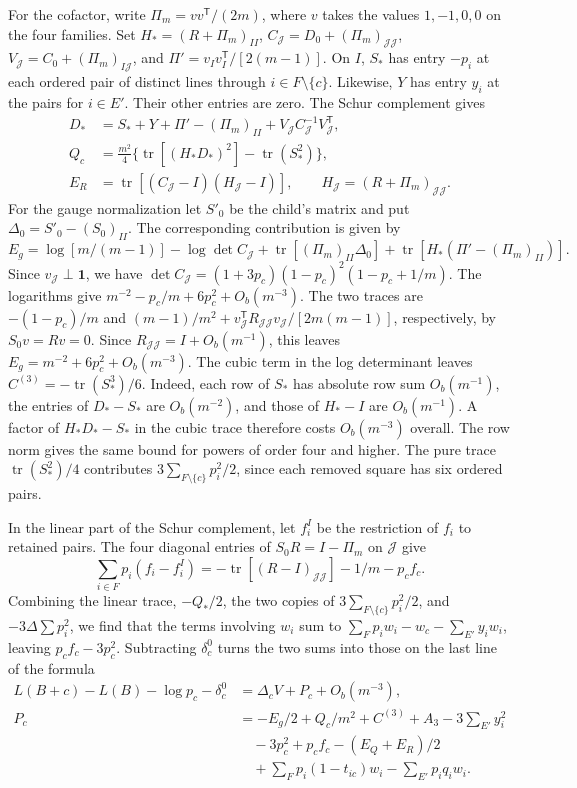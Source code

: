 For the cofactor, write \(\Pi_m=vv^{\mathsf T}/(2m)\), where \(v\) takes the values \(1,-1,0,0\) on the
four families. Set \(H_*=(R+\Pi_m)_{II}\), \(C_{\mathcal J}=D_0+(\Pi_m)_{\mathcal J\mathcal J}\),
\(V_{\mathcal J}=C_0+(\Pi_m)_{I\mathcal J}\), and \(\Pi'=v_Iv_I^{\mathsf T}/[2(m-1)]\). On \(I\), \(S_*\)
has entry \(-p_i\) at each ordered pair of distinct lines through \(i\in F\setminus\{c\}\). Likewise,
\(Y\) has entry \(y_i\) at the pairs for \(i\in E'\). Their other entries are zero. The Schur complement
gives \begin{align*}
 D_*&=S_*+Y+\Pi'-(\Pi_m)_{II}+V_{\mathcal J} C_{\mathcal J}^{-1}V_{\mathcal J}^{\mathsf T},\\
 Q_c&=\tfrac{m^2}4\{\operatorname{tr}[(H_*D_*)^2]-\operatorname{tr}(S_*^2)\},\\
 E_R&=\operatorname{tr}[(C_{\mathcal J}-I)(H_{\mathcal J}-I)],\qquad H_{\mathcal J}=(R+\Pi_m)_{\mathcal
 J\mathcal J}.
\end{align*} For the gauge normalization let \(S'_0\) be the child's matrix and put
\(\Delta_0=S'_0-(S_0)_{II}\). The corresponding contribution is given by \[
 E_g=\log[m/(m-1)]-\log\det C_{\mathcal J}
   +\operatorname{tr}[(\Pi_m)_{II}\Delta_0]
   +\operatorname{tr}[H_*(\Pi'-(\Pi_m)_{II})].
\] Since \(v_{\mathcal J}\perp\mathbf1\), we have \(\det C_{\mathcal J}=(1+3p_c)(1-p_c)^2(1-p_c+1/m)\).
The logarithms give \(m^{-2}-p_c/m+6p_c^2+O_b(m^{-3})\). The two traces are \(-(1-p_c)/m\) and
\((m-1)/m^2+v_{\mathcal J}^{\mathsf T}R_{\mathcal J\mathcal J}v_{\mathcal J}/[2m(m-1)]\), respectively,
by \(S_0v=Rv=0\). Since \(R_{\mathcal J\mathcal J}=I+O_b(m^{-1})\), this leaves
\(E_g=m^{-2}+6p_c^2+O_b(m^{-3})\). The cubic term in the log determinant leaves
\(C^{(3)}=-\operatorname{tr}(S_*^3)/6\). Indeed, each row of \(S_*\) has absolute row sum
\(O_b(m^{-1})\), the entries of \(D_*-S_*\) are \(O_b(m^{-2})\), and those of \(H_*-I\) are
\(O_b(m^{-1})\). A factor of \(H_*D_*-S_*\) in the cubic trace therefore costs \(O_b(m^{-3})\) overall.
The row norm gives the same bound for powers of order four and higher. The pure trace
\(\operatorname{tr}(S_*^2)/4\) contributes \(3\sum_{F\setminus\{c\}}p_i^2/2\), since each removed square
has six ordered pairs.

In the linear part of the Schur complement, let \(f_i^I\) be the restriction of \(f_i\) to retained
pairs. The four diagonal entries of \(S_0R=I-\Pi_m\) on \(\mathcal J\) give \[
 \sum_{i\in F}p_i(f_i-f_i^I)
 =-\operatorname{tr}[(R-I)_{\mathcal J\mathcal J}]-1/m-p_cf_c .
\] Combining the linear trace, \(-Q_*/2\), the two copies of \(3\sum_{F\setminus\{c\}}p_i^2/2\), and
\(-3\Delta\sum p_i^2\), we find that the terms involving \(w_i\) sum to
\(\sum_F p_iw_i-w_c-\sum_{E'}y_iw_i\), leaving \(p_cf_c-3p_c^2\). Subtracting \(\delta_c^0\)
turns the two sums into those on the last line of
the formula \begin{align*}
 L(B+c)-L(B)-\log p_c-\delta_c^0
   &=\Delta_c V+P_c+O_b(m^{-3}),\\
 P_c&=-E_g/2+Q_c/m^2+C^{(3)}+A_3-3\sum_{E'}y_i^2\\
 &\quad-3p_c^2+p_cf_c-(E_Q+E_R)/2\\
 &\quad+\sum_F p_i(1-t_{ic})w_i-\sum_{E'}p_iq_iw_i .
\end{align*}
